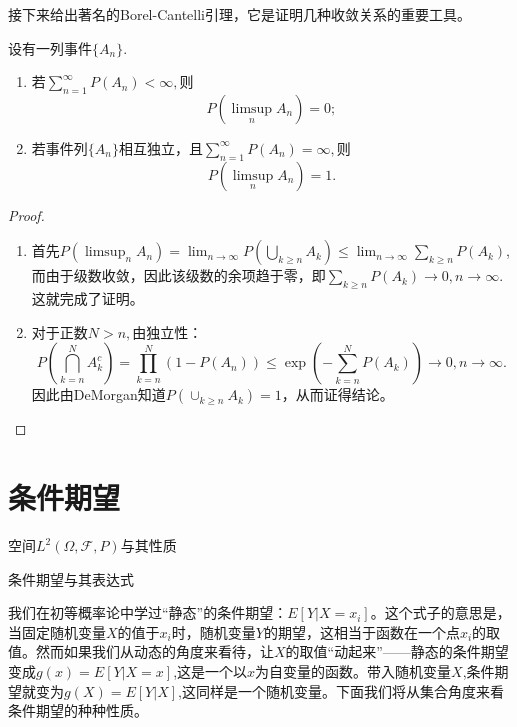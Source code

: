 \documentclass[lang=cn,10pt]{elegantbook}
\begin{document}
	接下来给出著名的Borel-Cantelli引理，它是证明几种收敛关系的重要工具。
	\begin{theorem}
		设有一列事件\(\{A_n\}\).
		\begin{enumerate}
			\item 若\(\sum_{n=1}^{\infty}P(A_n)<\infty,\)则\[P(\limsup_{n}A_n)=0;\]
			\item 若事件列\(\{A_n\}\)相互独立，且\(\sum_{n=1}^{\infty}P(A_n)=\infty,\)则\[P(\limsup_{n}A_n)=1.\]
		\end{enumerate}
	\end{theorem}
	\begin{proof}
		\begin{enumerate}
			\item 首先\(P(\limsup_{n}A_n)=\lim_{n\to \infty}P(\bigcup_{k\ge n}A_k)\le \lim_{n\to \infty}\sum_{k\ge n}P(A_k)\),而由于级数收敛，因此该级数的余项趋于零，即\(\sum_{k\ge n}P(A_k)\to 0,n\to \infty.\)这就完成了证明。
			\item 对于正数\(N>n,\)由独立性：\[P(\bigcap_{k=n}^NA_k^c)=\prod_{k=n}^{N}(1-P(A_n))\le\exp{(-\sum_{k=n}^{N}P(A_k))}\to 0,n\to\infty.\]因此由DeMorgan知道\(P(\cup_{k\ge n}A_k)=1\)，从而证得结论。
		\end{enumerate}
	\end{proof}
	
	\chapter{条件期望}
	\begin{introduction}
		\item 空间\(L^2(\Omega,\mathcal{F},P)\)与其性质
		\item 条件期望与其表达式
	\end{introduction}
	我们在初等概率论中学过“静态”的条件期望：\(E[Y|X=x_i]\)。这个式子的意思是，当固定随机变量\(X\)的值于\(x_i\)时，随机变量\(Y\)的期望，这相当于函数在一个点\(x_i\)的取值。然而如果我们从动态的角度来看待，让\(X\)的取值“动起来”——静态的条件期望变成\(g(x)=E[Y|X=x]\),这是一个以\(x\)为自变量的函数。带入随机变量\(X\),条件期望就变为\(g(X)=E[Y|X]\),这同样是一个随机变量。下面我们将从集合角度来看条件期望的种种性质。
\end{document}
